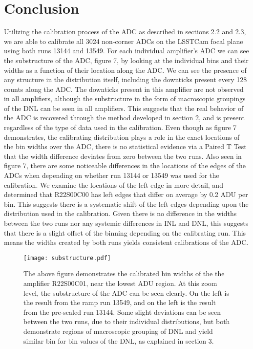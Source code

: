 \documentclass[11pt, letterpaper]{article}
\begin{document}
\section{Conclusion}
\indent


Utilizing the calibration process of the ADC as described in sections 2.2 and 2.3, we are able to calibrate all 3024 non-corner ADCs on the LSSTCam focal plane using both runs 13144 and 13549. 
For each individual amplifier’s ADC we can see the substructure of the ADC, figure 7, by looking at the individual bins and their widths as a function of their location along the ADC. 
We can see the presence of any structure in the distribution itself, including the downticks present every 128 counts along the ADC. 
The downticks present in this amplifier are not observed in all amplifiers, although the substructure in the form of macroscopic groupings of the DNL can be seen in all amplifiers.
This suggests that the real behavior of the ADC is recovered through the method developed in section 2, and is present regardless of the type of data used in the calibration.
Even though as figure 7 demonstrates, the calibrating distribution plays a role in the exact locations of the bin widths over the ADC, there is no statistical evidence via a Paired T Test that the width difference deviates from zero between the two runs.  
Also seen in figure 7, there are some noticeable differences in the locations of the edges of the ADCs when depending on whether run 13144 or 13549 was used for the calibration.
We examine the locations of the left edge in more detail, and determined that R22S00C00 has left edges that differ on average by 0.2 ADU per bin. 
This suggests there is a systematic shift of the left edges depending upon the distribution used in the calibration.
Given there is no difference in the widths between the two runs nor any systemic differences in INL and DNL, this suggests that there is a slight offset of the binning depending on the calibrating run.
This means the widths created by both runs yields consistent calibrations of the ADC. 
\begin{figure}
	\texttt{[image: substructure.pdf]}
	\caption{The above figure demonstrates the calibrated bin widths of the the amplifier R22S00C01, near the lowest ADU region. At this zoom level, the substructure of the ADC can be seen clearly. On the left is the result from the ramp run 13549, and on the left is the result from the pre-scaled run 13144.  Some slight deviations can be seen between the two runs, due to their individual distributions, but both demonstrate regions of macroscopic grouping of DNL and yield similar bin for bin values of the DNL, as explained in section 3.}
\end{figure}
\indent 
\end{document}
